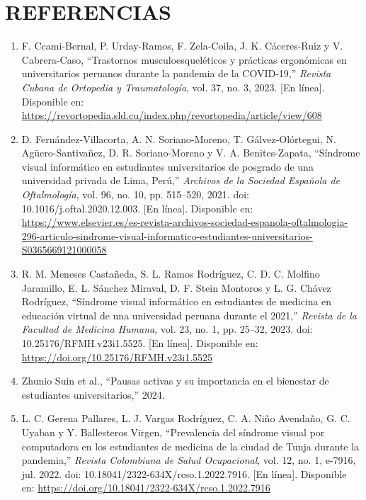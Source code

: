 
\section*{\centering REFERENCIAS}


\begin{enumerate}[leftmargin=1.8em,label=\lbrack\arabic*\rbrack,itemsep=0.6em]

\item F. Ccami-Bernal, P. Urday-Ramos, F. Zela-Coila, J. K. Cáceres-Ruiz y V. Cabrera-Caso, ``Trastornos musculoesqueléticos y prácticas ergonómicas en universitarios peruanos durante la pandemia de la COVID-19,'' \emph{Revista Cubana de Ortopedia y Traumatología}, vol. 37, no. 3, 2023. [En línea]. Disponible en: \url{https://revortopedia.sld.cu/index.php/revortopedia/article/view/608}

\item D. Fernández-Villacorta, A. N. Soriano-Moreno, T. Gálvez-Olórtegui, N. Agüero-Santivañez, D. R. Soriano-Moreno y V. A. Benites-Zapata, ``Síndrome visual informático en estudiantes universitarios de posgrado de una universidad privada de Lima, Perú,'' \emph{Archivos de la Sociedad Española de Oftalmología}, vol. 96, no. 10, pp. 515--520, 2021. doi: 10.1016/j.oftal.2020.12.003. [En línea]. Disponible en: \url{https://www.elsevier.es/es-revista-archivos-sociedad-espanola-oftalmologia-296-articulo-sindrome-visual-informatico-estudiantes-universitarios-S0365669121000058}

\item R. M. Meneses Castañeda, S. L. Ramos Rodríguez, C. D. C. Molfino Jaramillo, E. L. Sánchez Miraval, D. F. Stein Montoros y L. G. Chávez Rodríguez, ``Síndrome visual informático en estudiantes de medicina en educación virtual de una universidad peruana durante el 2021,'' \emph{Revista de la Facultad de Medicina Humana}, vol. 23, no. 1, pp. 25--32, 2023. doi: 10.25176/RFMH.v23i1.5525. [En línea]. Disponible en: \url{https://doi.org/10.25176/RFMH.v23i1.5525}

\item Zhunio Suin et al., ``Pausas activas y su importancia en el bienestar de estudiantes universitarios,'' 2024.

\item L. C. Gerena Pallares, L. J. Vargas Rodríguez, C. A. Niño Avendaño, G. C. Uyaban y Y. Ballesteros Virgen, ``Prevalencia del síndrome visual por computadora en los estudiantes de medicina de la ciudad de Tunja durante la pandemia,'' \emph{Revista Colombiana de Salud Ocupacional}, vol. 12, no. 1, e-7916, jul. 2022. doi: 10.18041/2322-634X/rcso.1.2022.7916. [En línea]. Disponible en: \url{https://doi.org/10.18041/2322-634X/rcso.1.2022.7916}


\end{enumerate}
